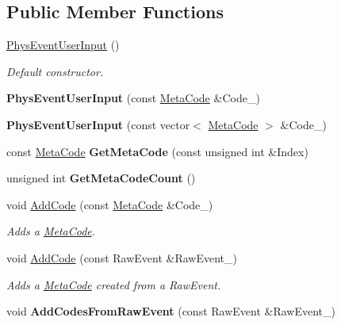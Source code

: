 \subsection*{Public Member Functions}
\begin{DoxyCompactItemize}
\item 
\hyperlink{classPhysEventUserInput_a6f8eaf698e8109d5cb30f2f17044f1ba}{PhysEventUserInput} ()
\begin{DoxyCompactList}\small\item\em Default constructor. \item\end{DoxyCompactList}\item 
\hypertarget{classPhysEventUserInput_ae13b1b02bfa3ef64dc4205478a68810f}{
{\bfseries PhysEventUserInput} (const \hyperlink{classMetaCode}{MetaCode} \&Code\_\-)}
\label{dc/d0e/classPhysEventUserInput_ae13b1b02bfa3ef64dc4205478a68810f}

\item 
\hypertarget{classPhysEventUserInput_a8b1c0e36d39075dffa4f88d10f2376d9}{
{\bfseries PhysEventUserInput} (const vector$<$ \hyperlink{classMetaCode}{MetaCode} $>$ \&Code\_\-)}
\label{dc/d0e/classPhysEventUserInput_a8b1c0e36d39075dffa4f88d10f2376d9}

\item 
\hypertarget{classPhysEventUserInput_aa564530c27f6983bb412e46c2c7ed086}{
const \hyperlink{classMetaCode}{MetaCode} {\bfseries GetMetaCode} (const unsigned int \&Index)}
\label{dc/d0e/classPhysEventUserInput_aa564530c27f6983bb412e46c2c7ed086}

\item 
\hypertarget{classPhysEventUserInput_a86df812a38566a572134100a422a8799}{
unsigned int {\bfseries GetMetaCodeCount} ()}
\label{dc/d0e/classPhysEventUserInput_a86df812a38566a572134100a422a8799}

\item 
void \hyperlink{classPhysEventUserInput_a4f5b94c64cd08c15b480e441d25a385d}{AddCode} (const \hyperlink{classMetaCode}{MetaCode} \&Code\_\-)
\begin{DoxyCompactList}\small\item\em Adds a \hyperlink{classMetaCode}{MetaCode}. \item\end{DoxyCompactList}\item 
void \hyperlink{classPhysEventUserInput_a385a4f7a6e88be43b6ba1ffc2a1bb5e3}{AddCode} (const RawEvent \&RawEvent\_\-)
\begin{DoxyCompactList}\small\item\em Adds a \hyperlink{classMetaCode}{MetaCode} created from a RawEvent. \item\end{DoxyCompactList}\item 
\hypertarget{classPhysEventUserInput_a9e42f42f9a4a42f792e5cf95856669c0}{
void {\bfseries AddCodesFromRawEvent} (const RawEvent \&RawEvent\_\-)}
\label{dc/d0e/classPhysEventUserInput_a9e42f42f9a4a42f792e5cf95856669c0}


\end{DoxyCompactItemize}
